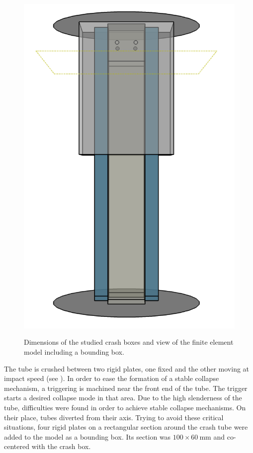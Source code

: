 \documentclass[cmfonts]{witpress}
\begin{document}
\begin{figure}[ht]
\begin{minipage}[b]{.48\linewidth}
    \label{fig:crash_box}
  \end{minipage}
  \hfill
  \begin{minipage}[b]{.48\linewidth}
    \centering
    \includegraphics[width=0.9\linewidth]{figures/IMG_CUTRES/general_transp}
    \label{fig:general}
  \end{minipage}
  \caption{Dimensions of the studied crash boxes and view of the finite element model including a bounding box.}
  \label{fig:modelo}
\end{figure}


The tube is crushed between two rigid plates, one fixed and the other moving at impact speed (see ). In order to ease the formation of a stable collapse mechanism, a triggering is machined near the front end of the tube. The trigger starts a desired collapse mode in that area. Due to the high slenderness of the tube, difficulties were found in order to achieve stable collapse mechanisms. On their place, tubes diverted from their axis. Trying to avoid these critical situations, four rigid plates on a rectangular section around the crash tube were added to the model as a bounding box. Its section was $\num{100}\times\SI{60}{\mm}$ and co-centered with the crash box.
\end{document}
